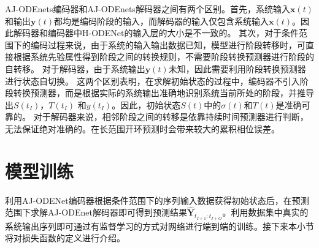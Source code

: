 
AJ-ODEnets编码器和AJ-ODEnets解码器之间有两个区别。首先，系统输入$\boldsymbol x(t)$和输出$\boldsymbol y(t)$都均是编码阶段的输入，而解码器的输入仅包含系统输入$\boldsymbol x(t)$。因此解码器和编码器中H-ODENet的输入层的大小是不一致的。
其次，对于条件范围下的编码过程来说，由于系统的输入输出数据已知，模型进行阶段转移时，可直接根据系统先验属性得到阶段之间的转换规则，不需要阶段转换预测器进行阶段的自转移。
对于解码器，由于系统输出$\boldsymbol y(t)$未知，因此需要利用阶段转换预测器进行状态自切换。
这两个区别表明，在求解初始状态的过程中，编码器不引入阶段转换预测器，而是根据实际的系统输出准确地识别系统当前所处的阶段，并推导出$S(t_I)$，$T(t_I)$ 和$y(t_I)$。因此，初始状态$S(t)$中的$\sigma(t)$和$T(t)$是准确可靠的。
对于解码器来说，相邻阶段之间的转移是依靠持续时间预测器进行判断，无法保证绝对准确的。在长范围开环预测时会带来较大的累积相位误差。
\section{模型训练}
\label{sec:loss_function}
利用AJ-ODENet编码器根据条件范围下的序列输入数据获得初始状态后，在预测范围下求解AJ-ODEnet解码器即可得到预测结果$\hat{\boldsymbol{Y}}_{t_{I+1}: t_{I+O}}$。利用数据集中真实的系统输出序列即可通过有监督学习的方式对网络进行端到端的训练。接下来本小节将对损失函数的定义进行介绍。

